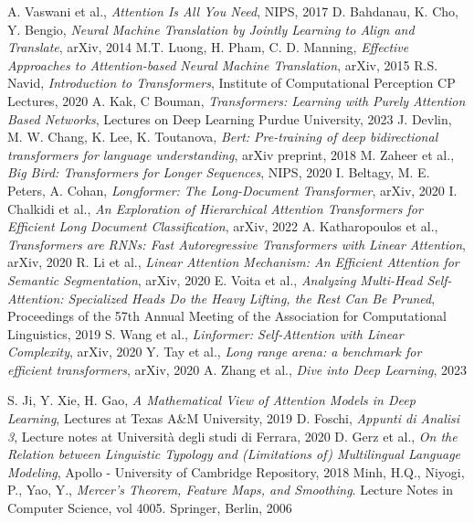 \documentclass[11pt]{article}
\theoremstyle{plain}
\theoremstyle{remark}
\theoremstyle{definition}
\theoremstyle{plain}
\theoremstyle{plain}
\begin{document}
\begin{thebibliography}{}
 A. Vaswani et al., \textit{Attention Is All You Need}, NIPS, 2017 
 D. Bahdanau, K. Cho, Y. Bengio, \textit{Neural Machine Translation by Jointly Learning to Align and Translate}, arXiv, 2014 
 M.T. Luong, H. Pham, C. D. Manning, \textit{Effective Approaches to Attention-based Neural Machine Translation}, arXiv, 2015 
 R.S. Navid, \textit{Introduction to Transformers}, Institute of Computational Perception CP Lectures, 2020
 A. Kak, C Bouman, \textit{Transformers: Learning with Purely Attention Based Networks}, Lectures on Deep Learning Purdue University, 2023
 J. Devlin, M. W. Chang, K. Lee, K. Toutanova, \textit{Bert: Pre-training of deep bidirectional transformers for language understanding}, arXiv preprint, 2018
 M. Zaheer et al., \textit{Big Bird: Transformers for Longer Sequences}, NIPS, 2020
 I. Beltagy, M. E. Peters, A. Cohan, \textit{Longformer: The Long-Document Transformer}, arXiv, 2020
 I. Chalkidi et al., \textit{An Exploration of Hierarchical Attention Transformers for Efficient Long Document Classification}, arXiv, 2022
 A. Katharopoulos et al., \textit{Transformers are RNNs: Fast Autoregressive Transformers with Linear Attention}, arXiv, 2020
 R. Li et al., \textit{Linear Attention Mechanism: An Efficient Attention for Semantic Segmentation}, arXiv, 2020
 E. Voita et al., \textit{Analyzing Multi-Head Self-Attention: Specialized Heads Do the Heavy Lifting, the Rest Can Be Pruned}, Proceedings of the 57th Annual Meeting of the Association for Computational Linguistics, 2019
 S. Wang et al., \textit{Linformer: Self-Attention with Linear Complexity}, arXiv, 2020
 Y. Tay et al., \textit{Long range arena: a benchmark for efficient transformers}, arXiv, 2020
 A. Zhang et al., \textit{Dive into Deep Learning}, 2023
 S. Ji, Y. Xie, H. Gao, \textit{A Mathematical View of Attention Models in Deep Learning}, Lectures at Texas A\&M University, 2019
 D. Foschi, \textit{Appunti di Analisi 3}, Lecture notes at Università degli studi di Ferrara, 2020
 D. Gerz et al., \textit{On the Relation between Linguistic Typology and (Limitations of) Multilingual Language Modeling}, Apollo - University of Cambridge Repository, 2018
 Minh, H.Q., Niyogi, P., Yao, Y., \textit{Mercer’s Theorem, Feature Maps, and Smoothing}. Lecture Notes in Computer Science, vol 4005. Springer, Berlin, 2006
\end{thebibliography}
\end{document}

